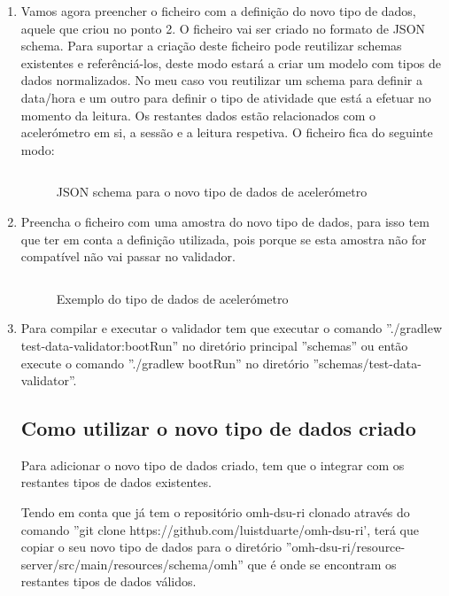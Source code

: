 \begin{enumerate}
\begin{figure}[!ht]
  \label{f:directorynewsample}
\end{figure}
  
\item Vamos agora preencher o ficheiro com a definição do novo tipo de dados, aquele que criou no ponto 2. O ficheiro vai ser criado no formato de \gls{JSON} schema. Para suportar a criação deste ficheiro pode reutilizar schemas existentes \cite{schema-library} e referênciá-los, deste modo estará a criar um modelo com tipos de dados normalizados. No meu caso vou reutilizar um schema para definir a data/hora e um outro para definir o tipo de atividade que está a efetuar no momento da leitura. Os restantes dados estão relacionados com o acelerómetro em si, a sessão e a leitura respetiva.
O ficheiro fica do seguinte modo: 

\begin{figure}[H]
\inputminted[fontsize=\scriptsize]{json}{code/accelerometer-1.0.json}
\caption[\gls{JSON} schema para o novo tipo de dados de acelerómetro]{\gls{JSON} schema para o novo tipo de dados de acelerómetro}
\label{f:accelerometer-json-schema}
\end{figure}

\item Preencha o ficheiro com uma amostra do novo tipo de dados, para isso tem que ter em conta a definição utilizada, pois porque se esta amostra não for compatível não vai passar no validador.

\begin{figure}[H]
\inputminted[fontsize=\scriptsize]{json}{code/example.json}
\caption[Exemplo do tipo de dados de acelerómetro]{Exemplo do tipo de dados de acelerómetro}
\label{f:accelerometer-json-data}
\end{figure}

\item Para compilar e executar o validador tem que executar o comando ''./gradlew test-data-validator:bootRun'' no diretório principal ''schemas'' ou então execute o comando ''./gradlew bootRun'' no diretório ''schemas/test-data-validator''. 

\subsection{Como utilizar o novo tipo de dados criado}

Para adicionar o novo tipo de dados criado, tem que o integrar com os restantes tipos de dados existentes. \par Tendo em conta que já tem o repositório omh-dsu-ri clonado através do comando ''git clone https://github.com/luistduarte/omh-dsu-ri', terá que copiar o seu novo tipo de dados para o diretório ''omh-dsu-ri/resource-server/src/main/resources/schema/omh'' que é onde se encontram os restantes tipos de dados válidos.

\end{enumerate}

\cleardoublepage
